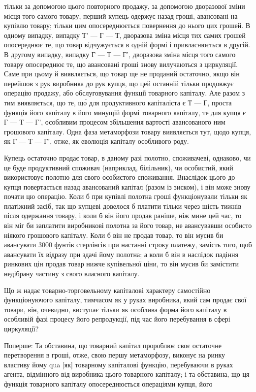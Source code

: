 \parcont{}  %
тільки за допомогою цього повторного продажу, за допомогою
дворазової зміни місця того самого товару, перший купець одержує назад гроші, авансовані на купівлю
товару; тільки цим
опосереднюється повернення до нього цих грошей. В одному
випадку, випадку Т' — Г — Т, дворазова зміна місця тих самих грошей опосереднює те, що товар
відчужується в одній
формі і привласнюється в другій. В другому випадку, випадку
Г — Т — Г', дворазова зміна місця того самого товару опосереднює те, що авансовані гроші знову
вилучаються з циркуляції.
Саме при цьому й виявляється, що товар ще не проданий остаточно, якщо він перейшов з рук виробника
до рук купця, що
цей останній тільки продовжує операцію продажу, або обслуговування функції товарного капіталу. Але
разом з тим виявляється, що те, що́ для продуктивного капіталіста є Т — Г,
проста функція його капіталу в його минущій формі товарного
капіталу, те для купця є Г — Т — Г', особливим процесом збільшення вартості авансованого ним
грошового капіталу. Одна
фаза метаморфози товару виявляється тут, щодо купця, як
Г — Т — Г', отже, як еволюція капіталу особливого роду.

Купець остаточно продає товар, в даному разі полотно,
споживачеві, однаково, чи це буде продуктивний споживач (наприклад, білільник), чи особистий, який
використовує полотно
для свого особистого споживання. Внаслідок цього до купця
повертається назад авансований капітал (разом із зиском), і він
може знову почати цю операцію. Коли б при купівлі полотна
гроші функціонували тільки як платіжний засіб, так що купцеві довелося б платити тільки через шість
тижнів після одержання товару, і коли б він його продав раніше, ніж мине цей
час, то він міг би заплатити виробникові полотна за його товар,
не авансувавши особисто ніякого грошового капіталу. Коли б він
не продав товар, то він мусив би авансувати 3000 фунтів стерлінгів при настанні строку платежу,
замість того, щоб авансувати їх відразу при здачі йому полотна; а коли б він в наслідок падіння
ринкових цін продав товар нижче купівельної ціни,
то він мусив би замістити недібрану частину з свого власного капіталу.

Що ж надає товарно-торговельному капіталові характеру
самостійно функціонуючого капіталу, тимчасом як у руках виробника, який сам продає свої товари, він,
очевидно, виступає
тільки як особлива форма його капіталу в особливій фазі процесу його репродукції, під час його
перебування в сфері циркуляції?

Поперше: Та обставина, що товарний капітал пророблює своє
остаточне перетворення в гроші, отже, свою першу метаморфозу, виконує на ринку властиву йому qua
[як] товарному капіталові функцію, перебуваючи в руках агента, відмінного від
виробника цього товарного капіталу; і та обставина, що ця функція товарного капіталу опосереднюється
операціями купця, його
\parbreak{}  %
